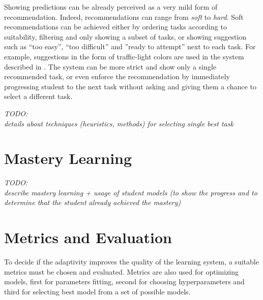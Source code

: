 Showing predictions can be already perceived as a very mild form of recommendation.
Indeed, recommendations can range from \emph{soft} to \emph{hard}.
Soft recommendations can be achieved either by
  ordering tasks according to suitability,
  filtering and only showing a subset of tasks,
  or showing suggestion such as
  ``too easy'', ``too difficult'' and ''ready to attempt'' next to each task.
For example, suggestions in the form of traffic-light colors
  are used in the system described in \cite{its-programming}.
The system can be more strict and show only a single recommended task,
  or even enforce the recommendation by immediately progressing student to
  the next task without asking and giving them a chance to select a different task.

\bigskip
\emph{TODO:\\details about techniques (heuristics, methods) for selecting single best task}


\section{Mastery Learning}
\label{sec:mastery-learning}

\emph{TODO:\\describe mastery learning + usage of student models%
(to show the progress and to determine that the student already achieved the mastery)}



\section{Metrics and Evaluation}
\label{sec:metrics-and-evaluation}


To decide if the adaptivity improves the quality of the learning system,
  a suitable metrics must be chosen and evaluated.
Metrics are also used for optimizing models,
  first for parameters fitting, second for choosing hyperparameters
  and third for selecting best model from a set of possible models.


